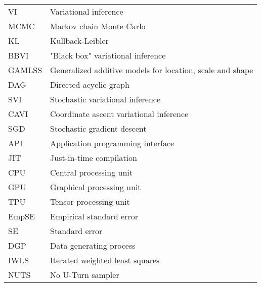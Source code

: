 \begin{tabular}{@{} l @{\hskip 1in} l}
  VI & Variational inference \\
  MCMC & Markov chain Monte Carlo \\
  KL & Kullback-Leibler \\
  BBVI & "Black box" variational inference \\
  GAMLSS & Generalized additive models for location, scale and shape \\
  DAG & Directed acyclic graph \\ 
  SVI & Stochastic variational inference \\
  CAVI & Coordinate ascent variational inference \\
  SGD & Stochastic gradient descent \\
  API & Application programming interface \\
  JIT & Just-in-time compilation \\
  CPU & Central processing unit \\
  GPU & Graphical processing unit \\
  TPU & Tensor processing unit \\
  EmpSE & Empirical standard error \\
  SE & Standard error \\
  DGP & Data generating process \\
  IWLS & Iterated weighted least squares \\
  NUTS & No U-Turn sampler \\
\end{tabular}
